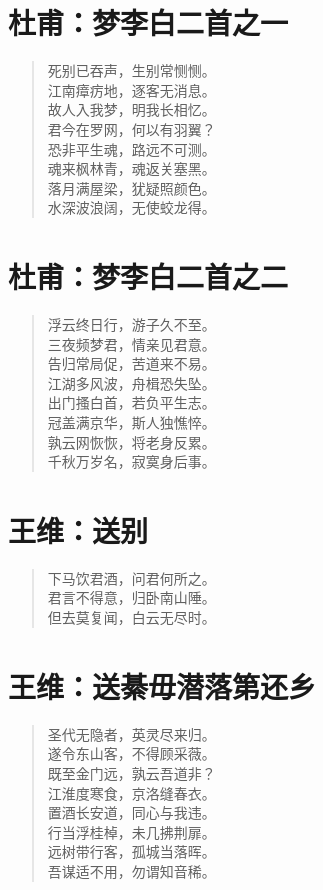 \documentclass[12pt,oneside]{book}
\newenvironment{shici}{
\begin{verse}
\centering\large\hspace{12pt}}
{\end{verse}}
\begin{document}
\chapter{杜甫：梦李白二首之一}
\begin{shici}
死别已吞声，生别常恻恻。\\
江南瘴疠地，逐客无消息。\\
故人入我梦，明我长相忆。\\
君今在罗网，何以有羽翼？\\
恐非平生魂，路远不可测。\\
魂来枫林青，魂返关塞黑。\\
落月满屋梁，犹疑照颜色。\\
水深波浪阔，无使蛟龙得。
\end{shici}



\chapter{杜甫：梦李白二首之二}
\begin{shici}
浮云终日行，游子久不至。\\
三夜频梦君，情亲见君意。\\
告归常局促，苦道来不易。\\
江湖多风波，舟楫恐失坠。\\
出门搔白首，若负平生志。\\
冠盖满京华，斯人独憔悴。\\
孰云网恢恢，将老身反累。\\
千秋万岁名，寂寞身后事。\\
\end{shici}

\chapter{王维：送别}
\begin{shici}
下马饮君酒，问君何所之。\\
君言不得意，归卧南山陲。\\
但去莫复闻，白云无尽时。
\end{shici}

\chapter{王维：送綦毋潜落第还乡}
\begin{shici}
圣代无隐者，英灵尽来归。\\
遂令东山客，不得顾采薇。\\
既至金门远，孰云吾道非？\\
江淮度寒食，京洛缝春衣。\\
置酒长安道，同心与我违。\\
行当浮桂棹，未几拂荆扉。\\
远树带行客，孤城当落晖。\\
吾谋适不用，勿谓知音稀。
\end{shici}
\end{document}
